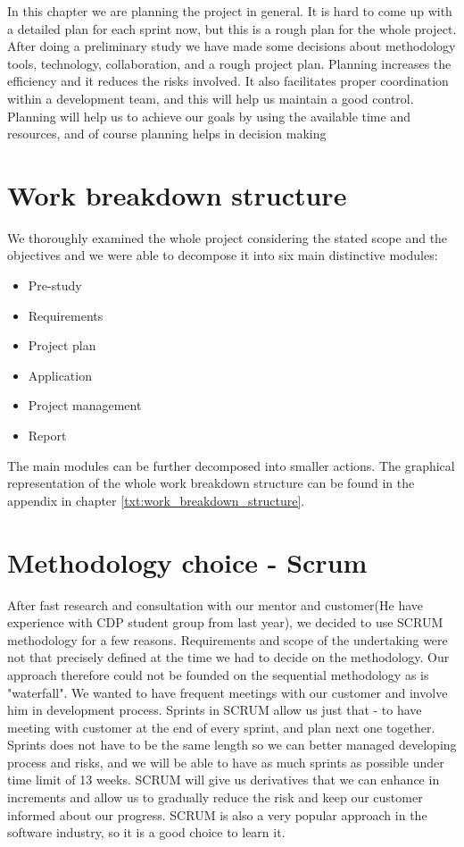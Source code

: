 In this chapter we are planning the project in general. It is hard to come up with a detailed plan for each sprint now, but this is a rough plan for the whole project. After doing a preliminary study we have made some decisions about methodology tools, technology, collaboration, and a rough project plan. Planning increases the efficiency and it reduces the risks involved. It also facilitates proper coordination within a development team, and this will help us maintain a good control. Planning will help us to achieve our goals by using the available time and resources, and of course planning helps in decision making  

\section{Work breakdown structure}
We thoroughly examined the whole project considering the stated scope and the objectives and we were able to decompose it into six main distinctive modules:

\begin{itemize}
\item Pre-study
\item Requirements
\item Project plan
\item Application
\item Project management
\item Report
\end{itemize}

The main modules can be further decomposed into smaller actions. The graphical representation of the whole work breakdown structure can be found in the appendix in chapter \ref{txt:work_breakdown_structure}.


\section{Methodology choice - Scrum}
After fast research and consultation with our mentor and customer(He have experience with CDP student group from last year), we decided to use SCRUM methodology for a few reasons. Requirements and scope of the undertaking were not that precisely defined at the time we had to decide on the methodology. Our approach therefore could not be founded on the sequential methodology as is "waterfall". We wanted to have frequent meetings with our customer and involve him in development process. Sprints in SCRUM allow us just that - 
to have meeting with customer at the end of every sprint, and plan next one together. Sprints does not have to be the same length so we can better managed developing process and risks, and we will be able to have as much sprints as possible under time limit of 13 weeks. SCRUM will give us derivatives that we can enhance in increments and allow us to gradually reduce the risk and keep our customer informed about our progress. SCRUM is also a very popular approach in the software industry, so it is a good choice to learn it.

